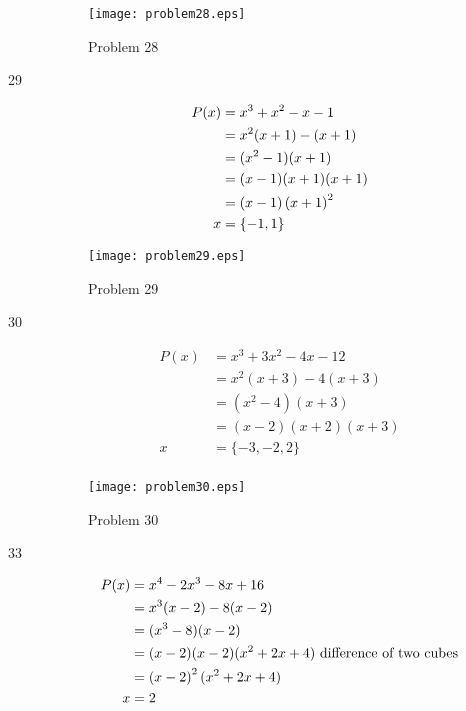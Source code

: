 \documentclass[landscape]{exam}
\begin{document}
\begin{description}
      \begin{figure}[H]
        \centering
        \texttt{[image: problem28.eps]}
        \caption*{Problem 28}
      \end{figure}

    \pagebreak

    \item[29] 
      \begin{align*}
        P(x) &= x^3 + x^2 - x - 1 \\
             &= x^2(x + 1) - (x + 1) \\
             &= (x^2 - 1)(x + 1) \\
             &= (x - 1)(x + 1)(x + 1) \\
             &= (x - 1)\del{x + 1}^2 \\
        x    &= \{ -1, 1 \} \\
      \end{align*}
      
      \begin{figure}[H]
        \centering
        \texttt{[image: problem29.eps]}
        \caption*{Problem 29}
      \end{figure}

    \pagebreak

    \item[30] 
      \begin{align*}
        P(x) &= x^3 + 3x^2 - 4x - 12 \\
             &= x^2(x + 3) - 4(x + 3) \\
             &= (x^2 - 4)(x + 3) \\
             &= (x - 2)(x + 2)(x + 3) \\
        x    &= \{ -3, -2, 2 \} \\
      \end{align*}
      
      \begin{figure}[H]
        \centering
        \texttt{[image: problem30.eps]}
        \caption*{Problem 30}
      \end{figure}

    \pagebreak

    \item[33] 
      \begin{align*}
        P(x) &= x^4 - 2x^3 - 8x + 16 \\
             &= x^3(x - 2) - 8(x - 2) \\
             &= (x^3 - 8)(x - 2) \\
             &= (x - 2)(x - 2)(x^2 + 2x + 4) \text{ difference of two cubes} \\
             &= \del{x - 2}^2(x^2 + 2x + 4) \\
        x    &= 2 \\
      \end{align*}
      

\end{description}
\end{document}
